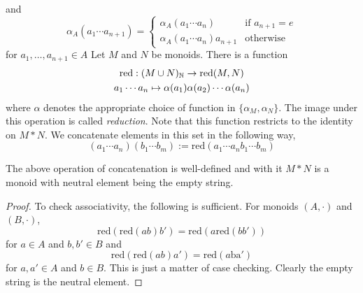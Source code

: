 and 
$$
    \alpha_A(a_1\cdots a_{n+1}) = 
    \begin{cases}
        \alpha_A(a_1\cdots a_n) & \text{if } a_{n+1} = e\\
        \alpha_A(a_1\cdots a_n)a_{n+1} & \text{otherwise}    
    \end{cases}
$$
for $a_1,\dots,a_{n+1}\in A$
Let $M$ and $N$ be monoids. There is a function 
\begin{gather*}
    \mathrm{red}: (M\cup N)_{\mathbb{N}} \rightarrow \mathrm{red}(M,N)\\
    a_1\cdots a_n \mapsto \alpha(a_1)\alpha(a_2)\cdots \alpha(a_n) 
\end{gather*}
where $\alpha$ denotes the appropriate choice of function in $\{\alpha_M,\alpha_N\}$. The image under this operation is called \emph{reduction}. Note that this function restricts to the identity on $M\ast N $.
We concatenate elements in this set in the following way,
    $$
        (a_1\cdots a_n)(b_1\cdots b_m) := \mathrm{red}(a_1\cdots a_nb_1\cdots b_m)
    $$

\begin{lemma}
    The above operation of concatenation is well-defined and with it $M\ast N$ is a monoid with neutral element being the empty string.
\end{lemma}
\begin{proof}
    To check associativity, the following is sufficient. For monoids $(A,\cdot)$ and $(B,\cdot)$, 
    $$
        \mathrm{red}(\mathrm{red}(ab)b')=\mathrm{red}(a\mathrm{red}(bb'))
    $$ 
    for $a\in A$ and $b,b'\in B$ and 
    $$
        \mathrm{red}(\mathrm{red}(ab)a') = \mathrm{red}(a\mathrm{ba'})
    $$
    for $a,a'\in A$ and $b\in B$. This is just a matter of case checking. Clearly the empty string is the neutral element.  
\end{proof}

